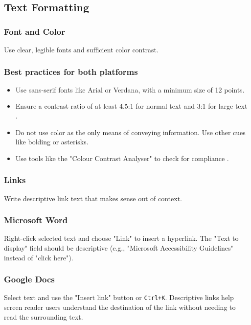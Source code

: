\subsection{Text Formatting}\label{ch15:ssec:text-formatting}

\subsubsection{Font and Color}\label{ch15:sssec:font-color}
Use clear, legible fonts and sufficient color contrast.

\subsubsection{Best practices for both platforms}\label{ch15:sssec:font-color-both}
\begin{itemize}
	\item Use sans-serif fonts like Arial or Verdana, with a minimum size of 12 points.
	\item Ensure a contrast ratio of at least 4.5:1 for normal text and 3:1 for large text \supercite{WCAG2018}.
	\item Do not use color as the only means of conveying information. Use other cues like bolding or asterisks.
	\item Use tools like the "Colour Contrast Analyser" to check for compliance \supercite{TGPiCCA}.
\end{itemize}

\subsubsection{Links}\label{ch15:sssec:links}
Write descriptive link text that makes sense out of context.

\subsubsection{Microsoft Word}\label{ch15:sssec:word-links}
Right-click selected text and choose "Link" to insert a hyperlink. The "Text to display" field should be descriptive (e.g., "Microsoft Accessibility Guidelines" instead of "click here").

\subsubsection{Google Docs}\label{ch15:sssec:docs-links}
Select text and use the "Insert link" button or \texttt{Ctrl+K}. Descriptive links help screen reader users understand the destination of the link without needing to read the surrounding text.

